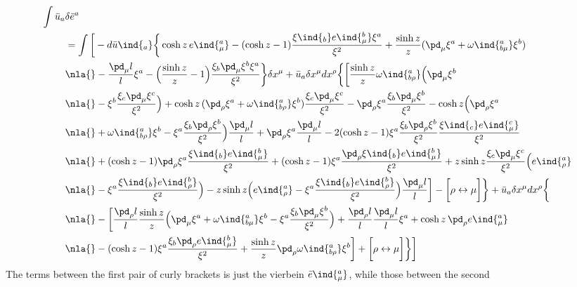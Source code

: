 \documentclass[11pt]{article}
\begin{document}
\begin{displaymath}
\begin{split}
	\int \bar{u}_a &\delta\bar{e}^a \\
	&= \int \bigg[ -d\bar{u}\ind{_a} \bigg\{ \cosh z\, 
	e\ind{^a_\mu} - (\cosh z - 1) \frac{\xi\ind{_b} e\ind{^b_\mu} 
		\xi^a}{\xi^2} + \frac{\sinh z}{z}(\pd_\mu \xi^a + 
	\omega\ind{^a_{b\mu}} \xi^b)
	\\
	&\nla{} - \frac{\pd_\mu l}{l} \xi^a - \Big( \frac{\sinh z}{z} 
	- 1 \Big) \frac{\xi_b \pd_\mu \xi^b \xi^a}{\xi^2} \bigg\} 
	\delta x^\mu + \bar{u}_a \delta x^\mu dx^\rho \bigg\{ \bigg[ 
	\frac{\sinh z}{z} \omega\ind{^a_{b\rho}} \Big( \pd_\mu \xi^b
	\\
	&\nla{} - \xi^b \frac{\xi_c \pd_\mu \xi^c}{\xi^2} \Big) + 
	\cosh z\, ( \pd_\rho \xi^a + \omega\ind{^a_{b\rho}} \xi^b )  
	\frac{\xi_c \pd_\mu \xi^c}{\xi^2} - \pd_\rho \xi^a \frac{\xi_b 
		\pd_\mu \xi^b}{\xi^2} - \cosh z \Big( \pd_\rho \xi^a
	\\
	&\nla{} + \omega\ind{^a_{b\rho}} \xi^b - \xi^a \frac{\xi_b 
		\pd_\rho \xi^b}{\xi^2} \Big) \frac{\pd_\mu l}{l} + \pd_\rho 
	\xi^a \frac{\pd_\mu l}{l} - 2(\cosh z - 1) \xi^a \frac{\xi_b 
		\pd_\rho \xi^b}{\xi^2} \frac{\xi\ind{_c} 
		e\ind{^c_\mu}}{\xi^2}
	\\
	&\nla{} + (\cosh z - 1) \pd_\rho \xi^a \frac{\xi\ind{_b} 
		e\ind{^b_\mu}}{\xi^2} + (\cosh z - 1) \xi^a \frac{\pd_\rho 
		\xi\ind{_b} e\ind{^b_\mu}}{\xi^2} + z\sinh z \frac{\xi_c 
		\pd_\mu \xi^c}{\xi^2} \Big( e\ind{^a_\rho}
	\\
	&\nla{} - \xi^a \frac{\xi\ind{_b} e\ind{^b_\rho}}{\xi^2} \Big) 
	- z \sinh z \Big( e\ind{^a_\rho} - \xi^a \frac{\xi\ind{_b} 
		e\ind{^b_\rho}}{\xi^2} \Big) \frac{\pd_\mu l}{l} \bigg] - 
	\bigg[ \rho \leftrightarrow \mu \bigg] \bigg\} + \bar{u}_a 
		\delta x^\mu dx^\rho \bigg\{
	\\
	&\nla{} -\bigg[ \frac{\pd_\rho l}{l} \frac{\sinh z}{z} \Big( 
	\pd_\mu \xi^a + \omega\ind{^a_{b\mu}} \xi^b - \xi^a 
	\frac{\xi_b \pd_\mu \xi^b}{\xi^2} \Big) + \frac{\pd_\rho l}{l} 
	\frac{\pd_\mu l}{l} \xi^a + \cosh z\, \pd_\rho e\ind{^a_\mu}
	\\
	&\nla{} - (\cosh z - 1) \xi^a \frac{\xi_b \pd_\rho 
		e\ind{^b_\mu}}{\xi^2} + \frac{\sinh z}{z} \pd_\rho 
	\omega\ind{^a_{b\rho}} \xi^b	\bigg] + \bigg[ \rho 
	\leftrightarrow \mu \bigg] \bigg\} \bigg]
\end{split}
\end{displaymath}
The terms between the first pair of curly brackets is just the 
vierbein $\bar{e}\ind{^a_\mu}$, while those between the second 
\end{document}
